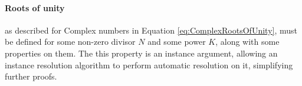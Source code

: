 \begin{AgdaAlign}
\paragraph{Roots of unity}\label{para:roots_of_unity} as described for Complex numbers in Equation 
\ref{eq:ComplexRootsOfUnity}, must be defined for some non-zero divisor $N$ 
and some power $K$, along with some properties on them.
The this  property is an instance argument, allowing an instance resolution algorithm
to perform automatic resolution on it, simplifying further proofs.
\begin{code}%
%
\>[6]\AgdaSpace{}%
\AgdaSymbol{:}\AgdaSpace{}%
\AgdaSymbol{(}\AgdaSpace{}%
\AgdaSymbol{:}\AgdaSpace{}%
\AgdaSymbol{)}\AgdaSpace{}%
\AgdaSpace{}%
\AgdaSpace{}%
\AgdaSpace{}%
\AgdaSymbol{:}\AgdaSpace{}%
\AgdaSpace{}%
\AgdaSpace{}%
\AgdaSpace{}%
\AgdaSpace{}%
\AgdaSymbol{(}\AgdaSpace{}%
\AgdaSymbol{:}\AgdaSpace{}%
\AgdaSymbol{)}\AgdaSpace{}%
\AgdaSpace{}%
\<%
\\
%
\>[6]%
\>[17]\AgdaSymbol{:}\AgdaSpace{}%
\AgdaSpace{}%
\AgdaSpace{}%
%
\>[43]\AgdaSpace{}%
\<%
\\
%
\>[6]%
\>[17]\AgdaSymbol{:}\AgdaSpace{}%
\AgdaSpace{}%
\AgdaSpace{}%
\AgdaSymbol{(}\AgdaSpace{}%
\AgdaSpace{}%
\AgdaSymbol{)}%
\>[43]\AgdaSpace{}%
\<%
\\
%
\>[6]%
\>[17]\AgdaSymbol{:}\AgdaSpace{}%
\AgdaSpace{}%
\AgdaSymbol{(}\AgdaSpace{}%
\AgdaSpace{}%
\AgdaSymbol{)}\AgdaSpace{}%
\AgdaSymbol{(}\AgdaSpace{}%
\AgdaSpace{}%
\AgdaSymbol{)}%
\>[43]\AgdaSpace{}%
\AgdaSpace{}%
\AgdaSpace{}%
\<%
\\
%
\>[6]%
\>[17]\AgdaSymbol{:}\AgdaSpace{}%
\AgdaSpace{}%
\AgdaSpace{}%
\AgdaSymbol{(}\AgdaSpace{}%
\AgdaSpace{}%
\AgdaSymbol{)}%
\>[43]\AgdaSpace{}%
\AgdaSymbol{(}\AgdaSpace{}%
\AgdaSpace{}%
\AgdaSymbol{)}\AgdaSpace{}%
\AgdaOperator{\AgdaField{*}}\AgdaSpace{}%
\AgdaSymbol{(}\AgdaSpace{}%
\AgdaSpace{}%
\AgdaSymbol{)}\<%
\end{code}
\end{AgdaAlign}

